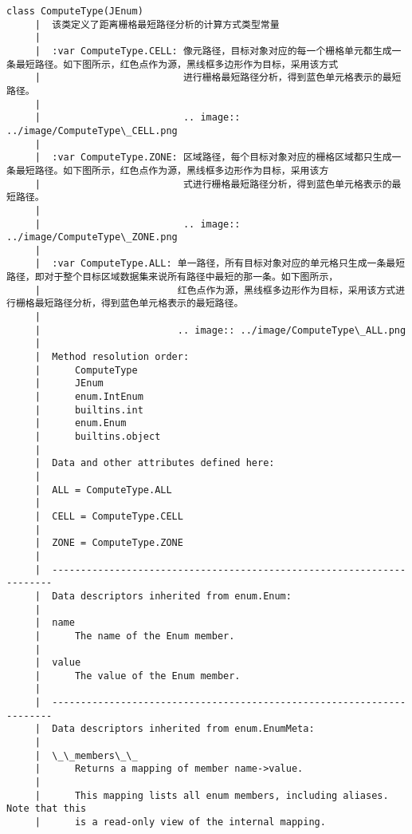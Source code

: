 \documentclass[11pt]{article}
\begin{document}
\begin{Verbatim}[commandchars=\\\{\}]
    class ComputeType(JEnum)
     |  该类定义了距离栅格最短路径分析的计算方式类型常量
     |  
     |  :var ComputeType.CELL: 像元路径，目标对象对应的每一个栅格单元都生成一条最短路径。如下图所示，红色点作为源，黑线框多边形作为目标，采用该方式
     |                         进行栅格最短路径分析，得到蓝色单元格表示的最短路径。
     |  
     |                         .. image:: ../image/ComputeType\_CELL.png
     |  
     |  :var ComputeType.ZONE: 区域路径，每个目标对象对应的栅格区域都只生成一条最短路径。如下图所示，红色点作为源，黑线框多边形作为目标，采用该方
     |                         式进行栅格最短路径分析，得到蓝色单元格表示的最短路径。
     |  
     |                         .. image:: ../image/ComputeType\_ZONE.png
     |  
     |  :var ComputeType.ALL: 单一路径，所有目标对象对应的单元格只生成一条最短路径，即对于整个目标区域数据集来说所有路径中最短的那一条。如下图所示，
     |                        红色点作为源，黑线框多边形作为目标，采用该方式进行栅格最短路径分析，得到蓝色单元格表示的最短路径。
     |  
     |                        .. image:: ../image/ComputeType\_ALL.png
     |  
     |  Method resolution order:
     |      ComputeType
     |      JEnum
     |      enum.IntEnum
     |      builtins.int
     |      enum.Enum
     |      builtins.object
     |  
     |  Data and other attributes defined here:
     |  
     |  ALL = ComputeType.ALL
     |  
     |  CELL = ComputeType.CELL
     |  
     |  ZONE = ComputeType.ZONE
     |  
     |  ----------------------------------------------------------------------
     |  Data descriptors inherited from enum.Enum:
     |  
     |  name
     |      The name of the Enum member.
     |  
     |  value
     |      The value of the Enum member.
     |  
     |  ----------------------------------------------------------------------
     |  Data descriptors inherited from enum.EnumMeta:
     |  
     |  \_\_members\_\_
     |      Returns a mapping of member name->value.
     |      
     |      This mapping lists all enum members, including aliases. Note that this
     |      is a read-only view of the internal mapping.
    

\end{Verbatim}
\end{document}
